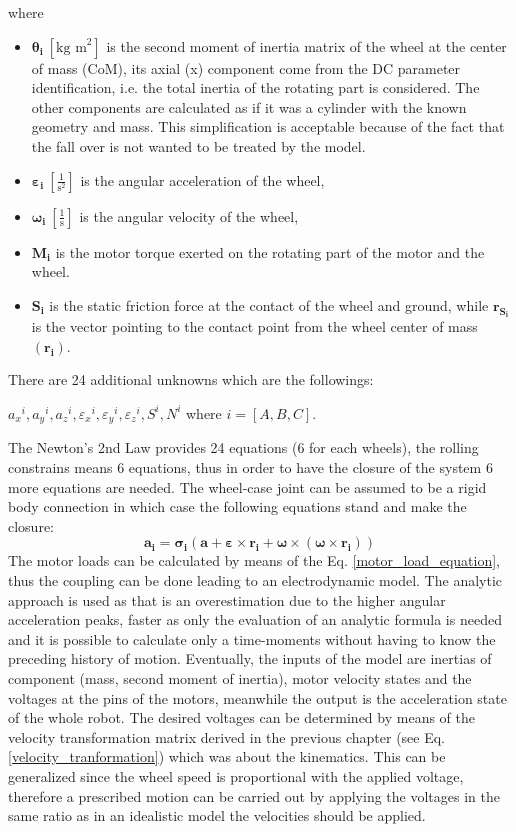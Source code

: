 \documentclass[12pt,english]{article}
\begin{document}
where \begin{itemize}
	\item $\boldsymbol{\theta_i}~[\text{kg m}^2]$ is the second moment of inertia matrix of the wheel at the center of mass (CoM), its axial (x) component come from the DC parameter identification, i.e. the total inertia of the rotating part is considered.
	The other components are calculated as if it was a cylinder with the known geometry and mass. This simplification is acceptable because of the fact that the fall over is not wanted to be treated by the model.
	\item $\boldsymbol{\varepsilon_i}~[\frac{1}{\text{s}^2}]$ is the angular acceleration of the wheel,
	\item $\boldsymbol{\omega_i}~[\frac{1}{\text{s}}]$ is the angular velocity of the wheel,
	\item $\mathbf{M_i}$ is the motor torque exerted on the rotating part of the motor and the wheel.
	\item $\mathbf{S_i}$ is the static friction force at the contact of the wheel and ground, while $\mathbf{r_{S_i}}$ is the vector pointing to the contact point from the wheel center of mass $(\mathbf{r_{i}})$.
\end{itemize}
There are 24 additional unknowns which are the followings:
\begin{center}
	${a_x}^i,{a_y}^i,{a_z}^i,{\varepsilon_x}^i,{\varepsilon_y}^i,{\varepsilon_z}^i,S^i,N^i$ where $i=[A,B,C]$.
\end{center}
The Newton's 2nd Law provides 24 equations (6 for each wheels), the rolling constrains means 6 equations, thus in order to have the closure of the system 6 more equations are needed.
The wheel-case joint can be assumed to be a rigid body connection in which case the following equations stand and make the closure:
\begin{equation}
	\mathbf{a_i} = \boldsymbol{\sigma_i} (\mathbf{a}+\boldsymbol{\varepsilon} \times \mathbf{r_i}+\boldsymbol{\omega} \times (\boldsymbol{\omega} \times \mathbf{r_i}))
\end{equation}
The motor loads can be calculated by means of the Eq. \ref{motor_load_equation}, thus the coupling can be done leading to an electrodynamic model. The analytic approach is used as that is an overestimation due to the higher angular acceleration peaks, faster as only the evaluation of an analytic formula is needed and it is possible to calculate only a time-moments without having to know the preceding history of motion. Eventually, the inputs of the model are inertias of component (mass, second moment of inertia), motor velocity states and the voltages at the pins of the motors, meanwhile the output is the acceleration state of the whole robot. The desired voltages can be determined by means of the velocity transformation matrix derived in the previous chapter (see Eq. \ref{velocity_tranformation}) which was about the kinematics. This can be generalized since the wheel speed is proportional with the applied voltage, therefore a prescribed motion can be carried out by applying the voltages in the same ratio as in an idealistic model the velocities should be applied.
\end{document}
